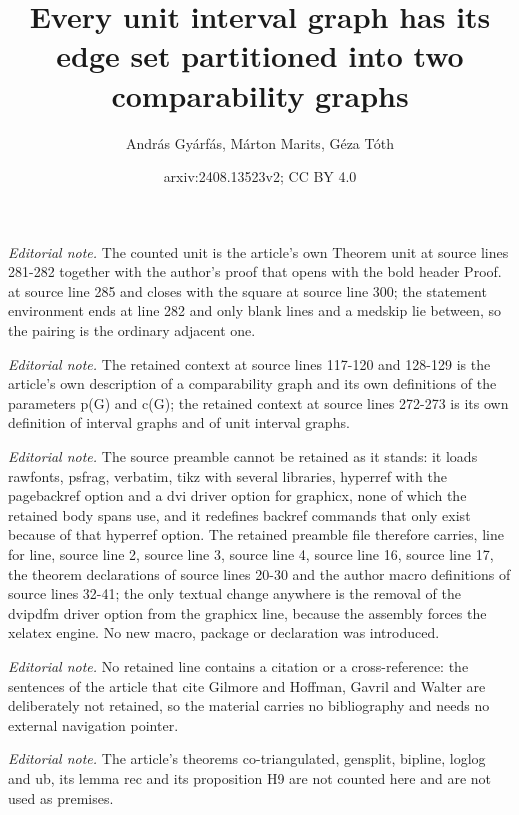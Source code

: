 \documentclass[12pt]{article}
\title{Every unit interval graph has its edge set partitioned into two comparability graphs}
\author{András Gyárfás, Márton Marits, Géza Tóth}
\date{arxiv:2408.13523v2; CC BY 4.0}
\begin{document}
\maketitle
\noindent\textit{Editorial note.} The counted unit is the article's own Theorem unit at source lines 281-282 together with the author's proof that opens with the bold header Proof. at source line 285 and closes with the square at source line 300; the statement environment ends at line 282 and only blank lines and a medskip lie between, so the pairing is the ordinary adjacent one.\par\medskip
\noindent\textit{Editorial note.} The retained context at source lines 117-120 and 128-129 is the article's own description of a comparability graph and its own definitions of the parameters p(G) and c(G); the retained context at source lines 272-273 is its own definition of interval graphs and of unit interval graphs.\par\medskip
\noindent\textit{Editorial note.} The source preamble cannot be retained as it stands: it loads rawfonts, psfrag, verbatim, tikz with several libraries, hyperref with the pagebackref option and a dvi driver option for graphicx, none of which the retained body spans use, and it redefines backref commands that only exist because of that hyperref option. The retained preamble file therefore carries, line for line, source line 2, source line 3, source line 4, source line 16, source line 17, the theorem declarations of source lines 20-30 and the author macro definitions of source lines 32-41; the only textual change anywhere is the removal of the dvipdfm driver option from the graphicx line, because the assembly forces the xelatex engine. No new macro, package or declaration was introduced.\par\medskip
\noindent\textit{Editorial note.} No retained line contains a citation or a cross-reference: the sentences of the article that cite Gilmore and Hoffman, Gavril and Walter are deliberately not retained, so the material carries no bibliography and needs no external navigation pointer.\par\medskip
\noindent\textit{Editorial note.} The article's theorems co-triangulated, gensplit, bipline, loglog and ub, its lemma rec and its proposition H9 are not counted here and are not used as premises.\par\medskip
\end{document}
